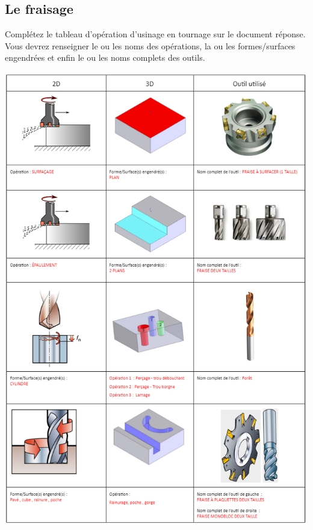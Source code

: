 \documentclass[12pt,a4paper]{article} %
\begin{document}
\subsection{Le fraisage}
\begin{exo} Complétez le tableau d'opération d'usinage en tournage sur le document réponse. Vous devrez renseigner le ou les noms des opérations, la ou les formes/surfaces engendrées et enfin le ou les noms complets des outils.  \end{exo}
\begin{center}
\includegraphics[scale=1.1]{CORR1.png}
\end{center}

\newpage
\end{document}
